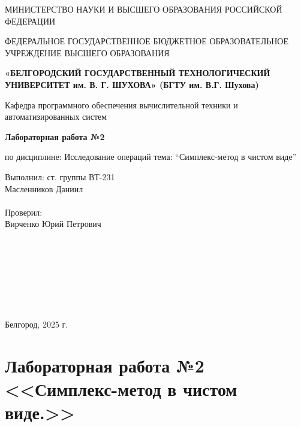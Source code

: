 \documentclass{report}
\newcommand{\q}[1]{``#1''}
\begin{document}
	\begin{titlepage}
		\begin{center}
			МИНИСТЕРСТВО НАУКИ И ВЫСШЕГО ОБРАЗОВАНИЯ\linebreak 
			РОССИЙСКОЙ ФЕДЕРАЦИИ\medskip
			
			ФЕДЕРАЛЬНОЕ ГОСУДАРСТВЕННОЕ БЮДЖЕТНОЕ ОБРАЗОВАТЕЛЬНОЕ 
			УЧРЕЖДЕНИЕ ВЫСШЕГО ОБРАЗОВАНИЯ\medskip
			
			\textbf{
				«БЕЛГОРОДСКИЙ ГОСУДАРСТВЕННЫЙ \linebreak
				ТЕХНОЛОГИЧЕСКИЙ УНИВЕРСИТЕТ им. В. Г. ШУХОВА»\linebreak
				(БГТУ им. В.Г. Шухова)
			}\bigskip
			
			Кафедра программного обеспечения вычислительной техники и автоматизированных систем
			\vspace{5cm}
			
			\Large\textbf{Лабораторная работа №2}
			
			\large по дисциплине: Исследование операций\linebreak
			тема: \q{Симплекс-метод в чистом виде}
		\end{center}\vspace{6cm}
		
		\begin{flushright}
			\begin{minipage}{7cm}
				Выполнил: ст. группы ВТ-231\\
				Масленников Даниил\\
				\\
				Проверил: \\
				Вирченко Юрий Петрович\\
			\end{minipage}
		\end{flushright}\bigskip
		
		\
		
		\
		
		\
		
		\
		
		
		\begin{center}
			Белгород, 2025 г.
		\end{center}
	\end{titlepage}
	
	\newpage
	
	\setcounter{secnumdepth}{-1}
	\chapter{Лабораторная работа №2 <<Симплекс-метод в чистом виде.>>}
	
\end{document}
